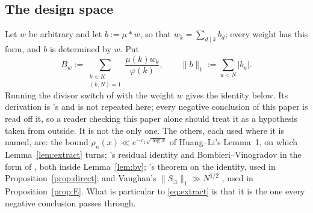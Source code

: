 \documentclass[11pt,a4paper]{article}
\theoremstyle{plain}
\theoremstyle{definition}
\theoremstyle{remark}
\begin{document}
\subsection{The design space}

Let $w$ be arbitrary and let $b:=\mu*w$, so that
$w_k=\sum_{d\mid k}b_d$; every weight has this form, and $b$ is
determined by $w$. Put
\begin{equation}\label{eq:Bw}
  B_w:=\sum_{\substack{k<K\\(k,N)=1}}\frac{\mu(k)w_k}{\varphi(k)},
  \qquad
  \|b\|_1:=\sum_{u<N}|b_u| .
\end{equation}
Running the divisor switch of \cite{P1} with the weight $w$ gives the
identity below. Its derivation is \cite{P1}'s and is not repeated
here; every negative conclusion of this paper is read off it, so a
reader checking this paper alone should treat it as a hypothesis taken
from outside. It is not the only one. The others, each used where it is
named, are: the bound $\rho_n(x)\ll e^{-c_1\sqrt{\log x}}$ of
Huang--Li's Lemma~1, on which Lemma~\ref{lem:extract} turns;
\cite{P1}'s residual identity and Bombieri--Vinogradov in the form of
\cite{MoV}, both inside Lemma~\ref{lem:bv}; \cite{P1}'s theorem on the
identity, used in Proposition~\ref{prop:direct}; and Vaughan's
$\|S_\Lambda\|_1\gg N^{1/2}$ \cite{Vau88}, used in
Proposition~\ref{prop:E}. What is
particular to \eqref{eq:extract} is that it is the one every negative
conclusion passes through.
\end{document}
